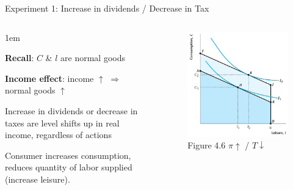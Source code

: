 \documentclass[11pt,aspectratio=43]{beamer}
\let\olditemize=\itemize
\let\endolditemize=\enditemize
\renewenvironment{itemize}{\olditemize \itemsep1em}{\endolditemize}
\theoremstyle{definition}
\begin{document}
\begin{frame}{Experiment 1: Increase in dividends / Decrease in Tax}
\label{slide:Experiment_1__Increase_in_dividends}
    \begin{columns}
        \begin{column}{0.5\textwidth}
            \begin{itemize}
                \item \textbf{Recall}: $ C $ \& $ l $ are normal goods
                \item \textbf{Income effect}: income $ \uparrow  $ $ \Rightarrow  $ normal goods $ \uparrow  $
                \item Increase in dividends or decrease in taxes are level shifts up in real income, regardless of actions
                \item Consumer increases consumption, reduces quantity of labor supplied (increase leisure).
            \end{itemize}
        \end{column}
        \begin{column}{0.5\textwidth}
            \begin{figure}
                \caption{Figure 4.6 $ \pi \uparrow $ / $ T \downarrow  $}
                \includegraphics[width=\textwidth]{./figures/Figure4_7.jpg}
            \end{figure}
        \end{column}
    \end{columns}
\end{frame}
\end{document}
